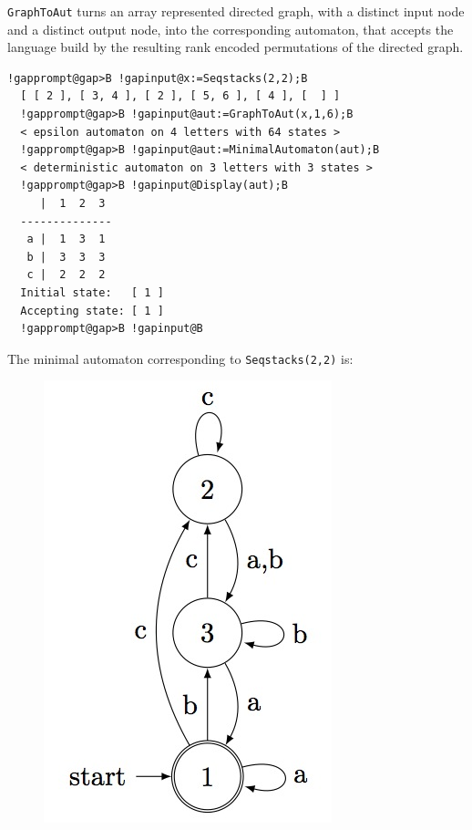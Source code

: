 \documentclass[a4paper,11pt]{report}
\begin{document}
{{{ \texttt{GraphToAut} turns an array represented directed graph, with a distinct input node and a
distinct output node, into the corresponding automaton, that accepts the
language build by the resulting rank encoded permutations of the directed
graph. 
\begin{Verbatim}[commandchars=!@B,fontsize=\small,frame=single,label=Example]
  !gapprompt@gap>B !gapinput@x:=Seqstacks(2,2);B
  [ [ 2 ], [ 3, 4 ], [ 2 ], [ 5, 6 ], [ 4 ], [  ] ]
  !gapprompt@gap>B !gapinput@aut:=GraphToAut(x,1,6);B
  < epsilon automaton on 4 letters with 64 states >
  !gapprompt@gap>B !gapinput@aut:=MinimalAutomaton(aut);B
  < deterministic automaton on 3 letters with 3 states >
  !gapprompt@gap>B !gapinput@Display(aut);B
     |  1  2  3  
  --------------
   a |  1  3  1  
   b |  3  3  3  
   c |  2  2  2  
  Initial state:   [ 1 ]
  Accepting state: [ 1 ]
  !gapprompt@gap>B !gapinput@B
\end{Verbatim}
  The minimal automaton corresponding to \texttt{Seqstacks(2,2)} is: \begin{figure}[H] \begin{center} \leavevmode
\includegraphics[scale=0.75]{img/ss22aut.jpg} \end{center} \end{figure}   
\begin{Verbatim}[commandchars=!@B,fontsize=\small,frame=single,label=Example]

\end{Verbatim}}}}
\end{document}
